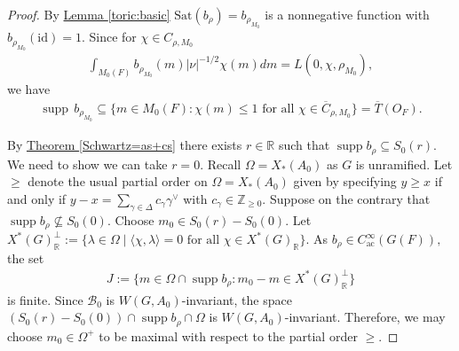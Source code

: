 \documentclass[10pt]{amsart}
\theoremstyle{definition}
\numberwithin{equation}{section}
\DeclareMathOperator{\supp}{\mathrm{supp}}
\numberwithin{equation}{subsection}
\newcommand{\RR}{\mathbb{R}}
\begin{document}
\begin{proof}
 By \hyperref[toric:basic]{Lemma \ref{toric:basic}} $\mathrm{Sat}(b_\rho) = b_{\rho_{M_0}}$ is a nonnegative function with $b_{\rho_{M_0}}(\mathrm{id})=1.$ Since for $\chi\in C_{\rho,M_0}$
 \begin{align*}
    \int_{M_0(F)}b_{\rho_{M_0}}(m) |\nu|^{-1/2}\chi(m)dm=L(0,\chi,\rho_{M_0}),
 \end{align*}
we have
\begin{align*}
    \supp\, b_{\rho_{M_0}}\subseteq \{ m\in M_0(F): \chi(m)\le 1 \textrm{ for all } \chi\in \overline{C}_{\rho,M_0} \}=\overline{T}(O_F).
\end{align*}

By \hyperref[Schwartz=as+cs]{Theorem \ref{Schwartz=as+cs}} there exists $r\in \RR$ such that $\supp b_\rho \subseteq S_0(r).$ We need to show we can take $r=0$. Recall $\Omega=X_\ast(A_0)$ as $G$ is unramified. Let $\ge$ denote the usual partial order on $\Omega=X_*(A_0)$ given by specifying $y\ge x $ if and only if $y-x = \sum_{\gamma\in \Delta}c_\gamma\gamma^\vee$ with $c_\gamma\in \mathbb{Z}_{\geq 0}.$ Suppose on the contrary that $\supp b_\rho \not\subseteq S_0(0).$ Choose $m_0\in S_0(r)-S_0(0).$ Let $X^\ast(G)_\RR^\perp:=\{\lambda\in \Omega\mid \langle \chi,\lambda\rangle = 0\text{ for all }\chi\in X^*(G)_\RR\}.$ As $b_\rho\in C^\infty_{\mathrm{ac}}(G(F)),$ the set 
\begin{align*}
    J:=\{m\in \Omega\cap \supp b_\rho: m_0 - m\in X^\ast(G)_\RR^\perp\}
\end{align*}
is finite. Since $\mathcal{B}_0$ is $W(G,A_0)$-invariant, the space $(S_0(r)-S_0(0))\cap \supp b_\rho\cap \Omega$ is $W(G,A_0)$-invariant. Therefore, we may choose $m_0\in \Omega^+$ to be maximal with respect to the partial order $\ge$.


\end{proof}
\end{document}
